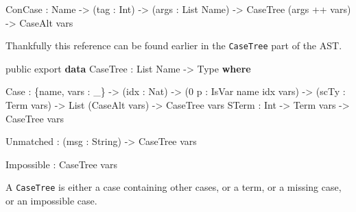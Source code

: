 \documentclass[
]{article}
\newenvironment{Shaded}{}{}
\newcommand{\DataTypeTok}[1]{\textcolor[rgb]{0.56,0.13,0.00}{#1}}
\newcommand{\DecValTok}[1]{\textcolor[rgb]{0.25,0.63,0.44}{#1}}
\newcommand{\KeywordTok}[1]{\textcolor[rgb]{0.00,0.44,0.13}{\textbf{#1}}}
\newcommand{\NormalTok}[1]{#1}
\newcommand{\OperatorTok}[1]{\textcolor[rgb]{0.40,0.40,0.40}{#1}}
\newcommand{\OtherTok}[1]{\textcolor[rgb]{0.00,0.44,0.13}{#1}}
\begin{document}
\begin{Shaded}
\begin{Highlighting}[]
\DataTypeTok{ConCase} \OperatorTok{:} \DataTypeTok{Name} \OtherTok{{-}\textgreater{}}\NormalTok{ (tag }\OperatorTok{:} \DataTypeTok{Int}\NormalTok{) }\OtherTok{{-}\textgreater{}}\NormalTok{ (args }\OperatorTok{:} \DataTypeTok{List} \DataTypeTok{Name}\NormalTok{) }\OtherTok{{-}\textgreater{}}
                 \DataTypeTok{CaseTree}\NormalTok{ (args }\OperatorTok{++}\NormalTok{ vars) }\OtherTok{{-}\textgreater{}} \DataTypeTok{CaseAlt}\NormalTok{ vars}
\end{Highlighting}
\end{Shaded}

Thankfully this reference can be found earlier in the \texttt{CaseTree}
part of the AST.

\begin{Shaded}
\begin{Highlighting}[]
\NormalTok{  public export}
  \KeywordTok{data} \DataTypeTok{CaseTree} \OperatorTok{:} \DataTypeTok{List} \DataTypeTok{Name} \OtherTok{{-}\textgreater{}} \DataTypeTok{Type} \KeywordTok{where}

       \DataTypeTok{Case} \OperatorTok{:}\NormalTok{ \{name, vars }\OperatorTok{:}\NormalTok{ \_\} }\OtherTok{{-}\textgreater{}}
\NormalTok{              (idx }\OperatorTok{:} \DataTypeTok{Nat}\NormalTok{) }\OtherTok{{-}\textgreater{}}
\NormalTok{              (}\DecValTok{0}\NormalTok{ p }\OperatorTok{:} \DataTypeTok{IsVar}\NormalTok{ name idx vars) }\OtherTok{{-}\textgreater{}}
\NormalTok{              (scTy }\OperatorTok{:} \DataTypeTok{Term}\NormalTok{ vars) }\OtherTok{{-}\textgreater{}} \DataTypeTok{List}\NormalTok{ (}\DataTypeTok{CaseAlt}\NormalTok{ vars) }\OtherTok{{-}\textgreater{}}
              \DataTypeTok{CaseTree}\NormalTok{ vars}
       \DataTypeTok{STerm} \OperatorTok{:} \DataTypeTok{Int} \OtherTok{{-}\textgreater{}} \DataTypeTok{Term}\NormalTok{ vars }\OtherTok{{-}\textgreater{}} \DataTypeTok{CaseTree}\NormalTok{ vars}

       \DataTypeTok{Unmatched} \OperatorTok{:}\NormalTok{ (msg }\OperatorTok{:} \DataTypeTok{String}\NormalTok{) }\OtherTok{{-}\textgreater{}} \DataTypeTok{CaseTree}\NormalTok{ vars}

       \DataTypeTok{Impossible} \OperatorTok{:} \DataTypeTok{CaseTree}\NormalTok{ vars}
\end{Highlighting}
\end{Shaded}

A \texttt{CaseTree} is either a case containing other cases, or a term,
or a missing case, or an impossible case.
\end{document}

